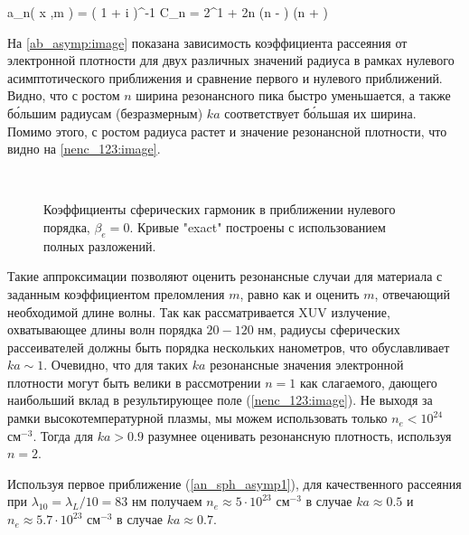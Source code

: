     \eq
		a_n\left( x ,\:m \right) = \left( 1 + i  \right)^{-1}
		\label{an_sph_asymp1}
	\qe
	\eqc
		C_n = 2^{1 + 2n} \Gamma(n - ) \Gamma(n + )
	\cqe

На \autoref{ab_asymp:image} показана зависимость коэффициента рассеяния от электронной плотности для двух различных значений радиуса в рамках нулевого асимптотического приближения и сравнение первого и нулевого приближений. Видно, что с ростом $n$ ширина резонансного пика быстро уменьшается, а также б\'{о}льшим радиусам (безразмерным) $ka$ соответствует б\'{о}льшая их ширина. Помимо этого, с ростом радиуса растет и значение резонансной плотности, что видно на \autoref{nenc_123:image}.

    \begin{figure}[H]
        \\
		\caption{Коэффициенты сферических гармоник в приближении нулевого порядка, $\beta_e = 0$. Кривые "exact" построены с использованием полных разложений.}
		\label{ab_asymp:image}
	\end{figure}


Такие аппроксимации позволяют оценить резонансные случаи для материала с заданным коэффициентом преломления $m$, равно как и оценить $m$, отвечающий необходимой длине волны. Так как рассматривается XUV излучение, охватывающее длины волн порядка $20-120$ нм, радиусы сферических рассеивателей должны быть порядка нескольких нанометров, что обуславливает $ka \sim 1$. Очевидно, что для таких $ka$ резонансные значения электронной плотности могут быть велики в рассмотрении $n = 1$ как слагаемого, дающего наибольший вклад в результирующее поле (\autoref{nenc_123:image}). Не выходя за рамки высокотемпературной плазмы, мы можем использовать только $n_e < 10^{24}$ $\textrm{см}^{-3}$. Тогда для $ka > 0.9$ разумнее оценивать резонансную плотность, используя $n = 2$.

Используя первое приближение (\ref{an_sph_asymp1}), для качественного рассеяния при $\lambda_{10} = \lambda_{L} / 10 = 83$ нм получаем $n_e \approx 5 \cdot 10^{23}$ $\textrm{см}^{-3}$ в случае $ka \approx 0.5$ и $n_e \approx 5.7 \cdot 10^{23}$ $\textrm{см}^{-3}$ в случае $ka \approx 0.7$.




